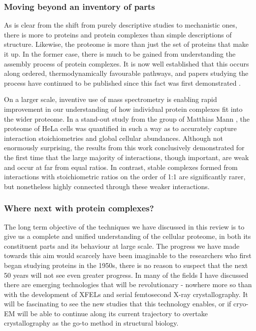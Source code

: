 \documentclass[a4paper,11pt,twoside,openright]{scrbook}
\begin{document}
\subsubsection{Moving beyond an inventory of parts}
As is clear from the shift from purely descriptive studies to mechanistic ones, there is more to proteins and protein complexes than simple descriptions of structure. Likewise, the proteome is more than just the set of proteins that make it up. In the former case, there is much to be gained from understanding the assembly process of protein complexes. It is now well established that this occurs along ordered, thermodynamically favourable pathways, and papers studying the process have continued to be published since this fact was first demonstrated \cite{Levy2008,Marsh2013,Appolaire2014,Macek2017,Mallik2017}.

On a larger scale, inventive use of mass spectrometry is enabling rapid improvement in our understanding of how individual protein complexes fit into the wider proteome. In a stand-out study from the group of Matthias Mann \cite{Hein2015}, the proteome of HeLa cells was quantified in such a way as to accurately capture interaction stoichiometries and global cellular abundances. Although not enormously surprising, the results from this work conclusively demonstrated for the first time that the large majority of interactions, though important, are weak and occur at far from equal ratios. In contrast, stable complexes formed from interactions with stoichiometric ratios on the order of 1:1 are significantly rarer, but nonetheless highly connected through these weaker interactions.

\subsubsection{Where next with protein complexes?}
The long term objective of the techniques we have discussed in this review is to give us a complete and unified understanding of the cellular proteome, in both its constituent parts and its behaviour at large scale. The progress we have made towards this aim would scarcely have been imaginable to the researchers who first began studying proteins in the 1950s, there is no reason to suspect that the next 50 years will not see even greater progress. In many of the fields I have discussed there are emerging technologies that will be revolutionary - nowhere more so than with the development of XFELs and serial femtosecond X-ray crystallography. It will be fascinating to see the new studies that this technology enables, or if cryo-EM will be able to continue along its current trajectory to overtake crystallography as the go-to method in structural biology.
\end{document}
